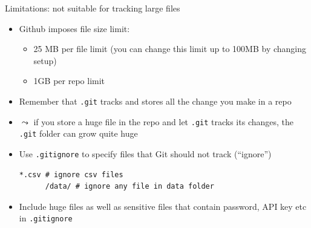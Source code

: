 \documentclass[handout,pdftex,10pt,aspectratio=169]{beamer}
\begin{document}
\begin{frame}[fragile]{Limitations: not suitable for tracking large files}
  \begin{itemize}[<+->]
    \item Github imposes file size limit:
    \begin{itemize}
      \item 25 MB per file limit
      (you can change this limit up to 100MB by changing setup)
      \item 1GB per repo limit
    \end{itemize}
    \item Remember that \texttt{.git} tracks and stores all the change you make in a repo
    \item[] $\leadsto$ if you store a huge file in the repo and let \texttt{.git} tracks
    its changes, the \texttt{.git} folder can grow quite huge
    \medskip
    \item Use \texttt{.gitignore} to specify files that Git should not track (``ignore'')
    \begin{Verbatim}[frame=single, label=.gitignore]
      *.csv # ignore csv files
      /data/ # ignore any file in data folder
    \end{Verbatim}
    \item Include huge files as well as sensitive files that contain password, API key etc in \texttt{.gitignore}
  \end{itemize}
\end{frame}
\end{document}
